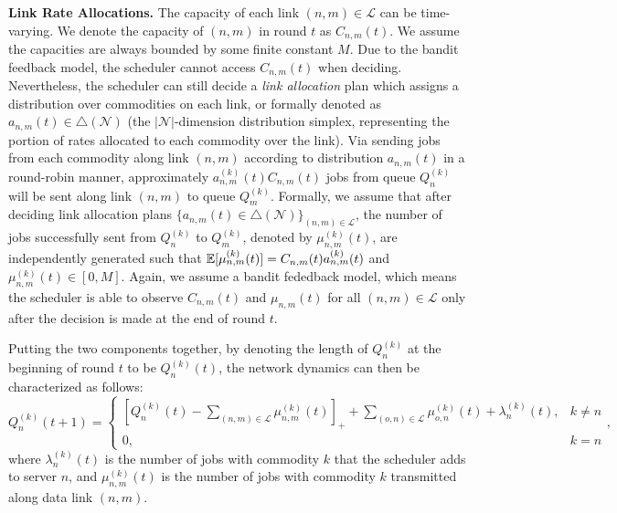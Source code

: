 \documentclass[11pt,fullpage,letterpaper]{article} %
\renewcommand{\bm}[1]{#1}%
\newcommand{\E}{\operatornamewithlimits{\mathbb{E}}}
\newcommand{\mN}{{\mathcal N}}
\newcommand{\mL}{{\mathcal L}}
\begin{document}
\textbf{Link Rate Allocations.} 
The capacity of each link $(n,m)\in \mL$ can be time-varying. We denote the capacity of $(n,m)$ in round $t$ as $C_{n,m}(t)$. We assume the capacities are always bounded by some finite constant $M$.
Due to the bandit feedback model, the scheduler cannot access $C_{n,m}(t)$ when deciding. Nevertheless, the scheduler can still decide a \textit{link allocation} plan which assigns a distribution over commodities on each link, or formally denoted as $\bm a_{n,m}(t)\in \triangle(\mN)$ (the $|\mN|$-dimension  distribution simplex, representing the portion of rates allocated to each commodity over the link).
Via sending jobs from each commodity along link $(n,m)$ according to distribution $\bm a_{n,m}(t)$ in a round-robin manner, approximately $a_{n,m}^{(k)}(t) C_{n,m}(t)$ jobs from queue $Q_n^{(k)}$ will be sent along link $(n,m)$ to queue $Q_m^{(k)}$.
Formally, we assume that after deciding link allocation plans $\{\bm a_{n,m}(t)\in \triangle(\mN)\}_{(n,m)\in \mL}$, the number of jobs successfully sent from $Q_n^{(k)}$ to $Q_m^{(k)}$, denoted by $\mu_{n,m}^{(k)}(t)$, are independently generated such that $\E[\mu_{n,m}^{(k)}(t)]=C_{n,m}(t) a_{n,m}^{(k)}(t)$ and $\mu_{n,m}^{(k)}(t)\in [0,M]$.
Again, we assume a bandit fededback model, which means the scheduler is able to observe $C_{n,m}(t)$ and $\bm \mu_{n,m}(t)$ for all $(n,m)\in \mL$ only after the decision is made at the end of round $t$.

Putting the two components together, by denoting the length of $Q_n^{(k)}$ at the beginning of round $t$ to be $Q_n^{(k)}(t)$, the network dynamics can then be characterized as follows:
\begin{equation}\label{eq:multi-hop stability dynamics}
Q_n^{(k)}(t+1)=\begin{cases}
\left [Q_n^{(k)}(t)-\sum_{(n,m)\in \mL}\mu_{n,m}^{(k)}(t)\right ]_+ + \sum_{(o,n)\in \mL} \mu_{o,n}^{(k)}(t) + \lambda_{n}^{(k)}(t),&k\ne n\\
0,&k=n
\end{cases},
\end{equation}
where $\lambda_n^{(k)}(t)$ is the number of jobs with commodity $k$ that the scheduler adds to server $n$, and $\mu_{n,m}^{(k)}(t)$ is the number of jobs with commodity $k$ transmitted along data link $(n,m)$.
\end{document}
